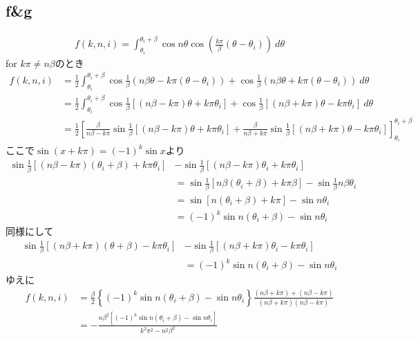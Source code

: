\documentclass[a4paper, 11pt]{article}
\begin{document}
\subsection{f\&g}
\begin{align}
    f(k,n,i) = \int_{\theta_i}^{\theta_i+\beta} \cos n\theta \cos\left(\frac{k\pi}{\beta}(\theta-\theta_i)\right)~d\theta
\end{align}
for $k\pi\neq n\beta$のとき
\begin{align}
    f(k,n,i) & = \frac{1}{2}\int_{\theta_i}^{\theta_i+\beta} \cos \frac{1}{\beta}(n\beta\theta - k\pi (\theta-\theta_i)) + \cos \frac{1}{\beta}(n\beta\theta+k\pi(\theta-\theta_i))~d\theta\\
    & = \frac{1}{2}\int_{\theta_i}^{\theta_i+\beta} \cos \frac{1}{\beta}\left[(n\beta-k\pi)\theta +k\pi\theta_i\right] + \cos \frac{1}{\beta}\left[(n\beta+k\pi)\theta-k\pi\theta_i\right]~d\theta\\
    & = \frac{1}{2}\left[\frac{\beta}{n\beta-k\pi} \sin \frac{1}{\beta}\left[(n\beta-k\pi)\theta +k\pi\theta_i\right] + \frac{\beta}{n\beta+k\pi}\sin \frac{1}{\beta}\left[(n\beta+k\pi)\theta-k\pi\theta_i\right]\right]_{\theta_i}^{\theta_i+\beta}
\end{align}
ここで$\sin(x+k\pi) = (-1)^k \sin x$より
\begin{align}
    \sin \frac{1}{\beta}\left[(n\beta-k\pi)(\theta_i+\beta) +k\pi\theta_i\right] & - \sin \frac{1}{\beta}\left[(n\beta-k\pi)\theta_i +k\pi\theta_i\right]\\
    &=  \sin \frac{1}{\beta}\left[n\beta(\theta_i+\beta) +k\pi\beta\right] - \sin \frac{1}{\beta}n\beta\theta_i\\
    &=  \sin \left[n(\theta_i+\beta) +k\pi\right] - \sin n\theta_i\\
    & = (-1)^k \sin n(\theta_i+\beta) - \sin n\theta_i
\end{align}
同様にして
\begin{align}
    \sin \frac{1}{\beta}\left[(n\beta+k\pi)(\theta+\beta)-k\pi\theta_i\right] & - \sin \frac{1}{\beta}\left[(n\beta+k\pi)\theta_i-k\pi\theta_i\right]\\
    & = (-1)^k \sin n(\theta_i+\beta) - \sin n\theta_i
\end{align}
ゆえに
\begin{align}
    f(k,n,i)  &= \frac{\beta}{2}\left\{(-1)^k \sin n(\theta_i+\beta) - \sin n\theta_i\right\}\frac{(n\beta+k\pi) + (n\beta-k\pi)}{(n\beta+k\pi)(n\beta-k\pi)}\\
    & = - \frac{n\beta^2\left[(-1)^k \sin n(\theta_i+\beta) - \sin n\theta_i\right]}{k^2\pi^2 - n^2\beta^2}
\end{align}
\end{document}
